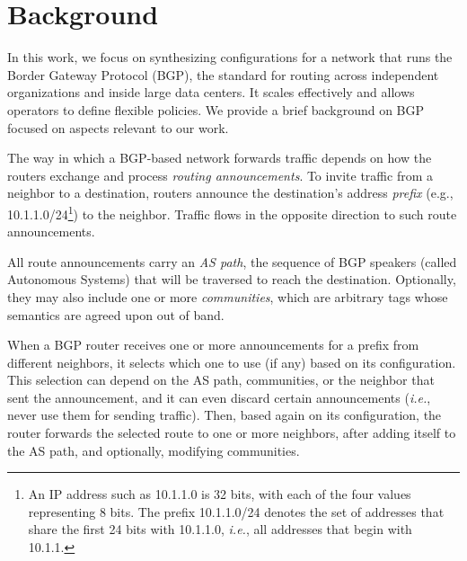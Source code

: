 \documentclass[numbers, 10pt, preprint]{sigplanconf}
\newcommand{\IE}{\emph{i.e.}}
\begin{document}
\section{Background}
\label{sec:background}

In this work, we focus on synthesizing configurations for a network that runs the Border Gateway Protocol (BGP), the standard for routing across independent organizations and inside large data centers. It scales effectively and allows operators to define flexible policies. We provide a brief background on BGP focused on aspects relevant to our work. 

The way in which a BGP-based network forwards traffic depends on how the routers exchange and process \emph{routing announcements}. To invite traffic from a neighbor to a destination, routers announce the destination's address {\em prefix} (e.g., 10.1.1.0/24\footnote{An IP address
such as 10.1.1.0 is 32 bits, with each of the four values representing 8 bits. The prefix 10.1.1.0/24 denotes the set of addresses that share the first 24 bits with 10.1.1.0, \IE, all addresses that begin with 10.1.1.}) to the neighbor. Traffic flows in the opposite direction to such route announcements.

All route announcements carry an {\em AS path}, the sequence of BGP speakers (called Autonomous Systems) that will be traversed to reach the destination.
Optionally, they may also include one or more {\em communities}, which are arbitrary tags whose semantics are agreed upon out of band.

When a BGP router receives one or more announcements for a prefix from different neighbors, it selects which one to use (if any) based on its configuration. This selection can depend on the AS path, communities, or the neighbor that sent the announcement, and it can even discard certain announcements (\IE, never use them for sending traffic). Then, based again on its configuration, the router forwards the selected route to one or more neighbors, after adding itself to the AS path, and optionally, modifying communities.
\end{document}
